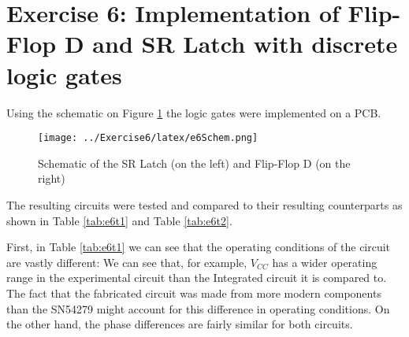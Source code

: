 
        \section{\color{olive}Exercise 6: Implementation of Flip-Flop D and SR Latch with discrete logic gates}
        Using the schematic on Figure \ref{fig:Schem} the logic gates were implemented on a PCB.
        
        \begin{figure}[h!]
            \begin{center}
                \texttt{[image: ../Exercise6/latex/e6Schem.png]}
                \caption{\color{cyan}Schematic of the  SR Latch (on the left) and Flip-Flop D (on the right)}
            \end{center}
            \label{fig:Schem}
        \end{figure}

        The resulting circuits were tested and compared to their resulting counterparts as shown in
        Table \ref{tab:e6t1} and Table \ref{tab:e6t2}.

        \begin{table}[h!]
            \begin{center}
                
                \label{tab:e6t1}
            \end{center}
        \end{table}
        \begin{table}[h!]
            \begin{center}
                
                \label{tab:e6t2}
            \end{center}
        \end{table}
        
        First, in Table \ref{tab:e6t1} we can see that the operating conditions of the circuit are vastly different:
        We can see that, for example, $V_{CC}$ has a wider operating range in the experimental circuit than the Integrated
        circuit it is compared to. The fact that the fabricated circuit was made from more modern components than the SN54279
        might account for this difference in operating conditions. On the other hand, the phase differences are fairly similar
        for both circuits.

